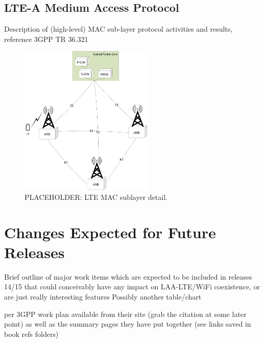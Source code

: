 \subsection{LTE-A Medium Access Protocol}
\label{lte-mac}
Description of (high-level) MAC sub-layer protocol activities and results, reference 3GPP TR 36.321 \cite{tr36321}


\begin{figure}[!ht]
	\centering
	\includegraphics[width=2.5in]{figures3/lteAnet}
	\caption{PLACEHOLDER: LTE MAC sublayer detail.}
	\label{figs:LTE-MAC-protocol}
\end{figure}



\section {Changes Expected for Future Releases}
\label{fut-chnge}
Brief outline of major work items which are expected to be included in releases 14/15 that could conceivably have any impact on LAA-LTE/WiFi coexistence, or are just really interesting features 
Possibly another table/chart

per 3GPP work plan available from their site (grab the citation at some later point) as well as the summary pages they have put together (see links saved in book refs folders)
